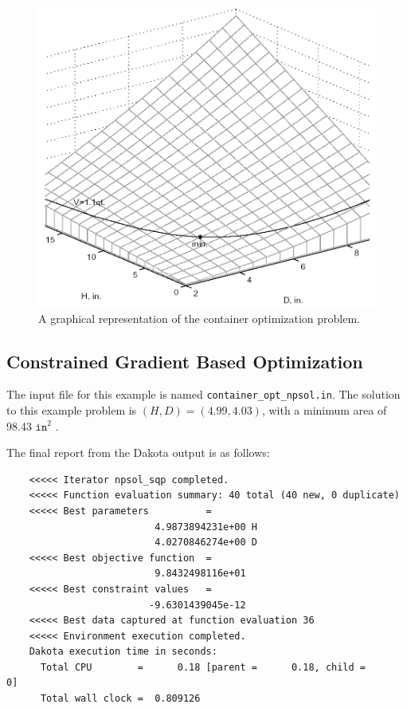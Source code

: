 \begin{figure}
  \centering
  \includegraphics[scale=0.3]{images/graphical_container_opt}
  \caption{A graphical representation of the container optimization
    problem.}
  \label{additional:figure02}
\end{figure}

\subsection{Constrained Gradient Based Optimization}

The input file for this example is named
\texttt{container\_opt\_npsol.in}. The solution to this example
problem is $(H,D)=(4.99,4.03)$, with a minimum area of 98.43
$\mathtt{in}^2$ .

The final report from the Dakota output is as follows:
\begin{small}
\begin{verbatim}
    <<<<< Iterator npsol_sqp completed.
    <<<<< Function evaluation summary: 40 total (40 new, 0 duplicate)
    <<<<< Best parameters          =
                          4.9873894231e+00 H
                          4.0270846274e+00 D
    <<<<< Best objective function  =
                          9.8432498116e+01
    <<<<< Best constraint values   =
                         -9.6301439045e-12
    <<<<< Best data captured at function evaluation 36
    <<<<< Environment execution completed.
    Dakota execution time in seconds:
      Total CPU        =      0.18 [parent =      0.18, child =         0]
      Total wall clock =  0.809126
\end{verbatim}
\label{cont_opt_npsol.out}
\end{small}


